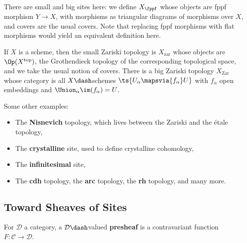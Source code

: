 \begin{example}

There are small and big sites here: we define \(X_{\fppf}\) whose
objects are fppf morphism \(Y\to X\), with morphisms as triangular
diagrams of morphisms over \(X\), and covers are the usual covers. Note
that replacing fppf morphisms with flat morphisms would yield an
equivalent definition here.

\end{example}

\begin{example}[?]

If \(X\) is a scheme, then the small Zariski topology is
\(X_{\mathrm{zar}}\) whose objects are \(\Op(X^{\mathrm{top}})\), the
Grothendieck topology of the corresponding topological space, and we
take the usual notion of covers. There is a big Zariski topology
\(X_{\mathrm{Zar}}\) whose category is all \(X\dash\)schemes
\(\ts{U_\alpha\mapsvia{f_\alpha} U}\) with \(f_\alpha\) open embeddings
and \(\Union_\alpha \im(f_\alpha) = U\).

\end{example}

\begin{example}[?]

Some other examples:

\begin{itemize}
\item
  The \textbf{Nisnevich} topology, which lives between the Zariski and
  the étale topology,
\item
  The \textbf{crystalline} site, used to define crystalline cohomology,
\item
  The \textbf{infinitesimal} site,
\item
  The \textbf{cdh} topology, the \textbf{arc} topology, the \textbf{rh}
  topology, and many more.
\end{itemize}

\end{example}

\hypertarget{toward-sheaves-of-sites}{%
\subsection{Toward Sheaves of Sites}\label{toward-sheaves-of-sites}}

\begin{definition}[Presheaf]

For \(\mathcal{D}\) a category, a \(\mathcal{D}\dash\)valued
\textbf{presheaf} is a contravariant function
\(F:\mathcal{C}\to \mathcal{D}\).

\end{definition}


